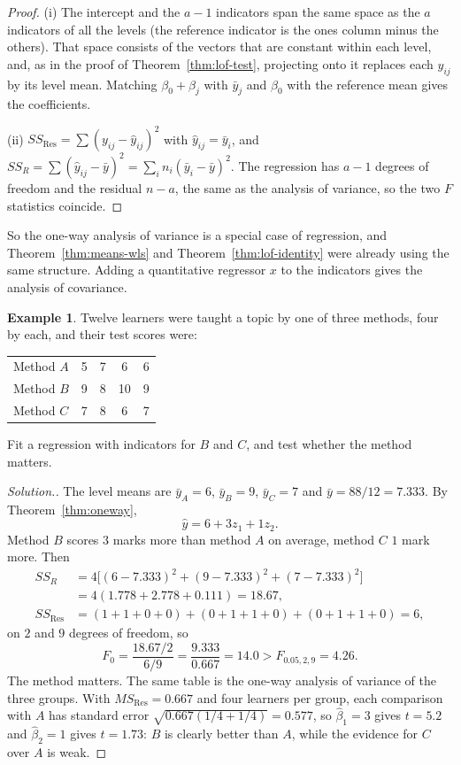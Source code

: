 \documentclass[11pt,a4paper]{article}
\numberwithin{equation}{section}
\theoremstyle{definition}
\newtheorem{exa}[thm]{Example}
\newenvironment{solution}
  {\renewcommand{\qedsymbol}{}\begin{proof}[\textit{Solution}.]}
  {\end{proof}}
\begin{document}
\begin{proof}
(i) The intercept and the $a - 1$ indicators span the same space as the $a$ indicators of all the levels (the
reference indicator is the ones column minus the others). That space consists of the vectors that are constant
within each level, and, as in the proof of Theorem~\ref{thm:lof-test}, projecting onto it replaces each $y_{ij}$
by its level mean. Matching $\beta_0 + \beta_j$ with $\bar y_j$ and $\beta_0$ with the reference mean gives the coefficients.

(ii) $SS_{\mathrm{Res}} = \sum(y_{ij} - \hat y_{ij})^2$ with $\hat y_{ij} = \bar y_i$, and
$SS_R = \sum(\hat y_{ij} - \bar y)^2 = \sum_i n_i(\bar y_i - \bar y)^2$. The regression has $a - 1$ degrees of freedom and
the residual $n - a$, the same as the analysis of variance, so the two $F$ statistics coincide.
\end{proof}

So the one-way analysis of variance is a special case of regression, and Theorem~\ref{thm:means-wls} and
Theorem~\ref{thm:lof-identity} were already using the same structure. Adding a quantitative regressor $x$ to
the indicators gives the analysis of covariance.

\begin{exa}\label{exa:methods}
Twelve learners were taught a topic by one of three methods, four by each, and their test scores were:
\begin{center}
\begin{tabular}{l|cccc}
Method $A$ & 5 & 7 & 6 & 6 \\
Method $B$ & 9 & 8 & 10 & 9 \\
Method $C$ & 7 & 8 & 6 & 7 \\
\end{tabular}
\end{center}
Fit a regression with indicators for $B$ and $C$, and test whether the method matters.
\end{exa}

\begin{solution}
The level means are $\bar y_A = 6$, $\bar y_B = 9$, $\bar y_C = 7$ and $\bar y = 88/12 = 7.333$. By
Theorem~\ref{thm:oneway},
\[
\hat y = 6 + 3z_1 + 1z_2 .
\]
Method $B$ scores $3$ marks more than method $A$ on average, method $C$ $1$ mark more. Then
\begin{align*}
SS_R &= 4\bigl[(6 - 7.333)^2 + (9 - 7.333)^2 + (7 - 7.333)^2\bigr] \\
&= 4(1.778 + 2.778 + 0.111) = 18.67 , \\
SS_{\mathrm{Res}} &= (1 + 1 + 0 + 0) + (0 + 1 + 1 + 0) + (0 + 1 + 1 + 0) = 6 ,
\end{align*}
on $2$ and $9$ degrees of freedom, so
\[
F_0 = \frac{18.67/2}{6/9} = \frac{9.333}{0.667} = 14.0 > F_{0.05,2,9} = 4.26 .
\]
The method matters. The same table is the one-way analysis of variance of the three groups. With
$MS_{\mathrm{Res}} = 0.667$ and four learners per group, each comparison with $A$ has standard error
$\sqrt{0.667(1/4 + 1/4)} = 0.577$, so $\hat\beta_1 = 3$ gives $t = 5.2$ and $\hat\beta_2 = 1$ gives $t = 1.73$: $B$ is clearly better
than $A$, while the evidence for $C$ over $A$ is weak.
\end{solution}
\end{document}
